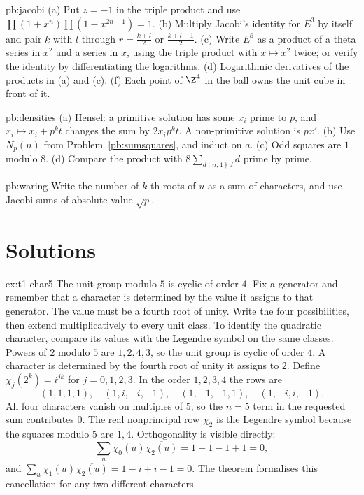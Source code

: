 \begin{hint}{pb:jacobi}
(a) Put $z=-1$ in the triple product and use $\prod(1+x^n)\prod(1-x^{2n-1})=1$. (b) Multiply Jacobi's identity for $E^3$ by itself and pair $k$ with $l$ through $r=\frac{k+l}2$
or $\frac{k+l-1}2$. (c) Write $E^6$ as a product of a theta series in $x^2$ and a series in $x$, using the triple product with $x\mapsto x^2$ twice; or verify the identity
by differentiating the logarithms. (d) Logarithmic derivatives of the products in (a) and (c). (f) Each point of $\Z^4$ in the ball owns the unit cube in front of it.
\end{hint}

\begin{hint}{pb:densities}
(a) Hensel: a primitive solution has some $x_i$ prime to $p$, and $x_i\mapsto x_i+p^kt$ changes the sum by $2x_ip^kt$. A non-primitive solution is $px'$. (b) Use $N_p(n)$
from Problem~\ref{pb:sumsquares}, and induct on $a$. (c) Odd squares are $1$ modulo $8$. (d) Compare the product with $8\sum_{d\mid n,4\nmid d}d$ prime by prime.
\end{hint}

\begin{hint}{pb:waring}
Write the number of $k$-th roots of $u$ as a sum of characters, and use Jacobi sums of absolute value $\sqrt p$.
\end{hint}

\section{Solutions}

\begin{solution}{ex:t1-char5}
\idea The unit group modulo $5$ is cyclic of order $4$. Fix a generator and remember that a character is determined by the value it assigns to that generator. The value must be a fourth root of unity. Write the four possibilities, then extend multiplicatively to every unit class. To identify the quadratic character, compare its values with the Legendre symbol on the same classes.
\writeup Powers of $2$ modulo $5$ are $1,2,4,3$, so the unit group is cyclic of order $4$. A character is determined by the fourth root of unity it assigns to $2$. Define $\chi_j(2^k)=i^{jk}$ for $j=0,1,2,3$. In the order $1,2,3,4$ the rows are
\[
(1,1,1,1),\quad(1,i,-i,-1),\quad
(1,-1,-1,1),\quad(1,-i,i,-1).
\]
All four characters vanish on multiples of $5$, so the $n=5$ term in the requested sum contributes $0$.
The real nonprincipal row $\chi_2$ is the Legendre symbol because the squares modulo $5$ are $1,4$. Orthogonality is visible directly:
\[
\sum_u\chi_0(u)\overline{\chi_2(u)}=1-1-1+1=0,
\]
and $\sum_u\chi_1(u)\overline{\chi_2(u)}=1-i+i-1=0$. The theorem formalises this cancellation for any two different characters.
\end{solution}

